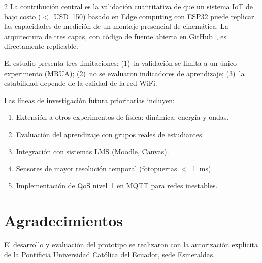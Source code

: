 \documentclass[12pt,twoside,titlepage]{ingenius}
\begin{document}
\begin{multicols}{2}
La contribuci\'on central es la validaci\'on cuantitativa de que un sistema IoT de bajo costo ($<$~USD~150) basado en Edge computing con ESP32 puede replicar las capacidades de medici\'on de un montaje presencial de cinem\'atica. La arquitectura de tres capas, con c\'odigo de fuente abierta en GitHub~\cite{r15}, es directamente replicable.

El estudio presenta tres limitaciones: (1)~la validaci\'on se limita a un \'unico experimento (MRUA); (2)~no se evaluaron indicadores de aprendizaje; (3)~la estabilidad depende de la calidad de la red WiFi.

Las l\'ineas de investigaci\'on futura prioritarias incluyen:
\begin{enumerate}
  \item Extensi\'on a otros experimentos de f\'isica: din\'amica, energ\'ia y ondas.
  \item Evaluaci\'on del aprendizaje con grupos reales de estudiantes.
  \item Integraci\'on con sistemas LMS (Moodle, Canvas).
  \item Sensores de mayor resoluci\'on temporal (fotopuertas $<$~1~ms).
  \item Implementaci\'on de QoS nivel~1 en MQTT para redes inestables.
\end{enumerate}


\section*{Agradecimientos}
El desarrollo y evaluaci\'on del prototipo se realizaron con la autorizaci\'on expl\'icita de la Pontificia Universidad Cat\'olica del Ecuador, sede Esmeraldas.



\end{multicols}
\end{document}
